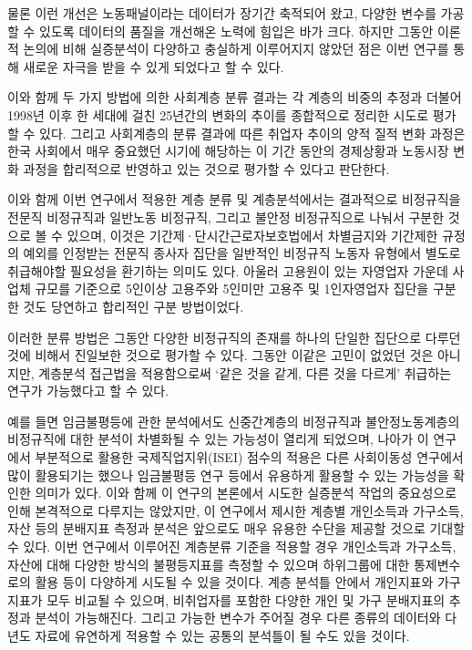 \documentclass[
  letterpaper,
  DIV=11,
  numbers=noendperiod]{scrartcl}
\begin{document}
물론 이런 개선은 노동패널이라는 데이터가 장기간 축적되어 왔고, 다양한
변수를 가공할 수 있도록 데이터의 품질을 개선해온 노력에 힘입은 바가
크다. 하지만 그동안 이론적 논의에 비해 실증분석이 다양하고 충실하게
이루어지지 않았던 점은 이번 연구를 통해 새로운 자극을 받을 수 있게
되었다고 할 수 있다.

이와 함께 두 가지 방법에 의한 사회계층 분류 결과는 각 계층의 비중의
추정과 더불어 1998년 이후 한 세대에 걸친 25년간의 변화의 추이를
종합적으로 정리한 시도로 평가할 수 있다. 그리고 사회계층의 분류 결과에
따른 취업자 추이의 양적 질적 변화 과정은 한국 사회에서 매우 중요했던
시기에 해당하는 이 기간 동안의 경제상황과 노동시장 변화 과정을
합리적으로 반영하고 있는 것으로 평가할 수 있다고 판단한다.

이와 함께 이번 연구에서 적용한 계층 분류 및 계층분석에서는 결과적으로
비정규직을 전문직 비정규직과 일반노동 비정규직, 그리고 불안정
비정규직으로 나눠서 구분한 것으로 볼 수 있으며, 이것은
기간제·단시간근로자보호법에서 차별금지와 기간제한 규정의 예외를 인정받는
전문직 종사자 집단을 일반적인 비정규직 노동자 유형에서 별도로 취급해야할
필요성을 환기하는 의미도 있다. 아울러 고용원이 있는 자영업자 가운데
사업체 규모를 기준으로 5인이상 고용주와 5인미만 고용주 및 1인자영업자
집단을 구분한 것도 당연하고 합리적인 구분 방법이었다.

이러한 분류 방법은 그동안 다양한 비정규직의 존재를 하나의 단일한
집단으로 다루던 것에 비해서 진일보한 것으로 평가할 수 있다. 그동안
이같은 고민이 없었던 것은 아니지만, 계층분석 접근법을 적용함으로써 `같은
것을 같게, 다른 것을 다르게' 취급하는 연구가 가능했다고 할 수 있다.

예를 들면 임금불평등에 관한 분석에서도 신중간계층의 비정규직과
불안정노동계층의 비정규직에 대한 분석이 차별화될 수 있는 가능성이 열리게
되었으며, 나아가 이 연구에서 부분적으로 활용한 국제직업지위(ISEI) 점수의
적용은 다른 사회이동성 연구에서 많이 활용되기는 했으나 임금불평등 연구
등에서 유용하게 활용할 수 있는 가능성을 확인한 의미가 있다. 이와 함께 이
연구의 본론에서 시도한 실증분석 작업의 중요성으로 인해 본격적으로
다루지는 않았지만, 이 연구에서 제시한 계층별 개인소득과 가구소득, 자산
등의 분배지표 측정과 분석은 앞으로도 매우 유용한 수단을 제공할 것으로
기대할 수 있다. 이번 연구에서 이루어진 계층분류 기준을 적용할 경우
개인소득과 가구소득, 자산에 대해 다양한 방식의 불평등지표를 측정할 수
있으며 하위그룹에 대한 통제변수로의 활용 등이 다양하게 시도될 수 있을
것이다. 계층 분석틀 안에서 개인지표와 가구지표가 모두 비교될 수 있으며,
비취업자를 포함한 다양한 개인 및 가구 분배지표의 추정과 분석이
가능해진다. 그리고 가능한 변수가 주어질 경우 다른 종류의 데이터와 다년도
자료에 유연하게 적용할 수 있는 공통의 분석틀이 될 수도 있을 것이다.
\end{document}
